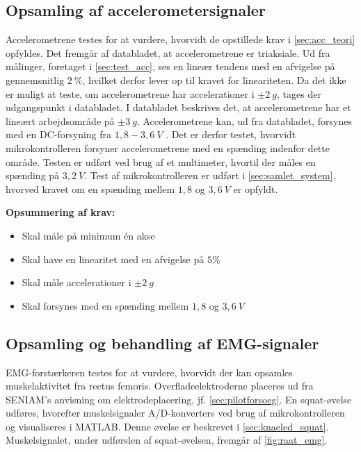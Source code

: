 \subsection{Opsamling af accelerometersignaler}

Accelerometrene testes for at vurdere, hvorvidt de opstillede krav i \autoref{sec:acc_teori} opfyldes. 
Det fremgår af databladet, at accelerometrene er triaksiale.  
Ud fra målinger, foretaget i \autoref{sec:test_acc}, ses en lineær tendens med en afvigelse på gennemsnitlig $2~\%$, hvilket derfor lever op til kravet for lineariteten. 
Da det ikke er muligt at teste, om accelerometrene har accelerationer i $\pm2~g$, tages der udgangspunkt i databladet. 
I databladet beskrives det, at accelerometrene har et lineært arbejdsområde på $\pm 3~g$.
Accelerometrene kan, ud fra databladet, forsynes med en DC-forsyning fra $1,8-3,6~V$ \citep{analogdevices2009}.  
Det er derfor testet, hvorvidt mikrokontrolleren forsyner accelerometrene med en spænding indenfor dette område. 
Testen er udført ved brug af et multimeter, hvortil der måles en spænding på $3,2~V$. 
Test af mikrokontrolleren er udført i \autoref{sec:samlet_system}, hvorved kravet om en spænding mellem $1,8$ og $3,6~V$ er opfyldt.

\vspace{3mm}
\textbf{Opsummering af krav:}
\begin{itemize}
\item[\text{\sffamily \checkmark}] Skal måle på minimum én akse
\item[\text{\sffamily \checkmark}] Skal have en linearitet med en afvigelse på $5\%$
\item[\text{\sffamily \checkmark}] Skal måle accelerationer i $\pm2~g$
\item[\text{\sffamily \checkmark}] Skal forsynes med en spænding mellem $1,8$ og $3,6~V$
\end{itemize}


\subsection{Opsamling og behandling af EMG-signaler}

EMG-forstærkeren testes for at vurdere, hvorvidt der kan opsamles muskelaktivitet fra rectus femoris. 
Overfladeelektroderne placeres ud fra SENIAM's anvisning om elektrodeplacering, jf. \autoref{sec:pilotforsoeg}. 
En squat-øvelse udføres, hvorefter muskelsignaler A/D-konverters ved brug af mikrokontrolleren og visualiseres i MATLAB. 
Denne øvelse er beskrevet i \autoref{sec:knaeled_squat}. 
Muskelsignalet, under udførslen af squat-øvelsen, fremgår af \autoref{fig:raat_emg}. 

